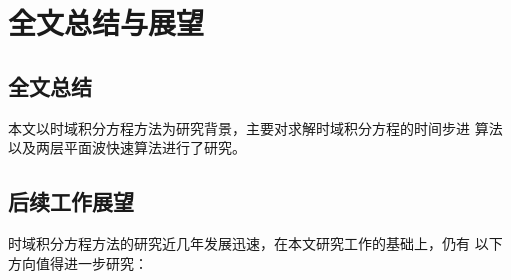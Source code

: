 
\chapter{全文总结与展望}
\label{chapter:conclusion}
\section{全文总结}
本文以时域积分方程方法为研究背景，主要对求解时域积分方程的时间步进
算法以及两层平面波快速算法进行了研究。
\section{后续工作展望}
时域积分方程方法的研究近几年发展迅速，在本文研究工作的基础上，仍有
以下方向值得进一步研究：
